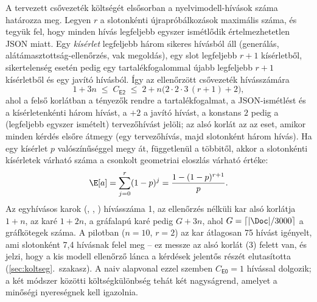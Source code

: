 A tervezett csővezeték költségét elsősorban a nyelvimodell-hívások száma határozza meg. Legyen $r$ a
slotonkénti újrapróbálkozások maximális száma, és tegyük fel, hogy minden hívás legfeljebb egyszer
ismétlődik értelmezhetetlen JSON miatt. Egy \emph{kísérlet} legfeljebb három sikeres hívásból áll
(generálás, alátámasztottság-ellenőrzés, vak megoldás), egy slot legfeljebb $r+1$ kísérletből, sikertelenség
esetén pedig egy tartalékfogalommal újabb legfeljebb $r+1$ kísérletből és egy javító hívásból. Így az
ellenőrzött csővezeték hívásszámára
\begin{equation}
1+3n\;\le\;C_{\textsf{E2}}\;\le\;2+n\bigl(2\cdot 2\cdot 3\,(r+1)+2\bigr),
\label{eq:callbounds}
\end{equation}
ahol a felső korlátban a tényezők rendre a tartalékfogalmat, a JSON-ismétlést és a kísérletenkénti
három hívást, a $+2$ a javító hívást, a konstans $2$ pedig a (legfeljebb egyszer ismételt) tervezőhívást
jelöli; az alsó korlát az az eset, amikor minden kérdés elsőre átmegy (egy tervezőhívás, majd
slotonként három hívás). Ha egy kísérlet $p$ valószínűséggel megy át, függetlenül a többitől, akkor a
slotonkénti kísérletek várható száma a csonkolt geometriai eloszlás várható értéke:
\begin{equation}
\E[a]=\sum_{j=0}^{r}(1-p)^{j}=\frac{1-(1-p)^{r+1}}{p}.
\label{eq:expattempts}
\end{equation}
Az egyhívásos karok (, , ) hívásszáma 1, az ellenőrzés
nélküli  kar alsó korlátja $1+n$, az  karé $1+2n$, a gráfalapú  karé pedig
$G+3n$, ahol $G=\lceil|\Doc|/3000\rceil$ a gráfkötegek száma. A pilotban ($n=10$, $r=2$) az  kar átlagosan 75 hívást igényelt, ami slotonként 7,4 hívásnak
felel meg -- ez messze az alsó korlát (3) felett van, és jelzi, hogy a kis modell ellenőrző lánca a
kérdések jelentős részét elutasította (\ref{sec:koltseg}.~szakasz). A naiv alapvonal ezzel szemben
$C_{\textsf{E0}}=1$ hívással dolgozik; a két módszer közötti költségkülönbség tehát két nagyságrend,
amelyet a minőségi nyereségnek kell igazolnia.
